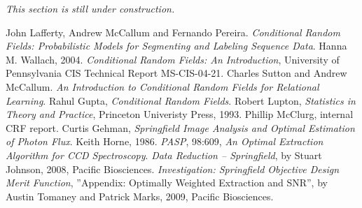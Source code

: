 \documentclass[10pt]{article}
\begin{document}
\emph{This section is still under construction.}

\begin{thebibliography}{99}
	 John Lafferty, Andrew McCallum and Fernando Pereira.  \textit{Conditional Random Fields: Probabilistic Models for Segmenting and Labeling Sequence Data}.
	 Hanna M. Wallach, 2004.  \textit{Conditional Random Fields: An Introduction}, University of Pennsylvania CIS Technical Report MS-CIS-04-21.
	 Charles Sutton and Andrew McCallum.  \textit{An Introduction to Conditional Random Fields for Relational Learning}.
	 Rahul Gupta, \textit{Conditional Random Fields}.
	 Robert Lupton, \textit{Statistics in Theory and Practice}, Princeton Univeristy Press, 1993.
	 Phillip McClurg, internal CRF report.
	 Curtis Gehman, \textit{Springfield Image Analysis and Optimal Estimation of Photon Flux}.
	 Keith Horne, 1986. \textit{PASP}, 98:609, \textit{An Optimal Extraction Algorithm for CCD Spectroscopy}.
   \textit{Data Reduction -- Springfield}, by Stuart Johnson, 2008, Pacific Biosciences.
   \textit{Investigation: Springfield Objective Design Merit Function}, ''Appendix: Optimally Weighted Extraction and SNR'', by Austin Tomaney and Patrick Marks, 2009, Pacific Biosciences.
\end{thebibliography}
\end{document}
